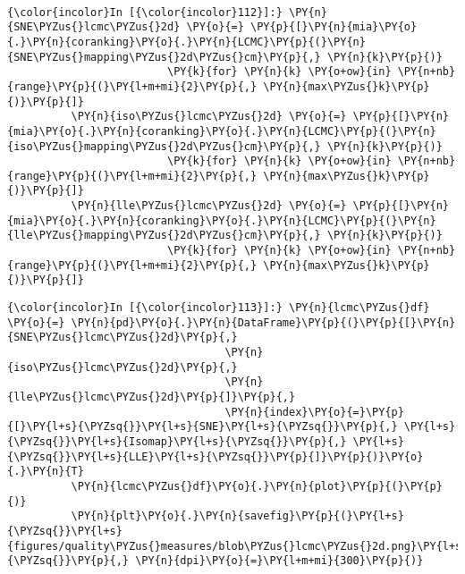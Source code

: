     \begin{center}
    \end{center}
    { \hspace*{\fill} \\}

    \begin{Verbatim}[commandchars=\\\{\}]
{\color{incolor}In [{\color{incolor}112}]:} \PY{n}{SNE\PYZus{}lcmc\PYZus{}2d} \PY{o}{=} \PY{p}{[}\PY{n}{mia}\PY{o}{.}\PY{n}{coranking}\PY{o}{.}\PY{n}{LCMC}\PY{p}{(}\PY{n}{SNE\PYZus{}mapping\PYZus{}2d\PYZus{}cm}\PY{p}{,} \PY{n}{k}\PY{p}{)}
                         \PY{k}{for} \PY{n}{k} \PY{o+ow}{in} \PY{n+nb}{range}\PY{p}{(}\PY{l+m+mi}{2}\PY{p}{,} \PY{n}{max\PYZus{}k}\PY{p}{)}\PY{p}{]}
          \PY{n}{iso\PYZus{}lcmc\PYZus{}2d} \PY{o}{=} \PY{p}{[}\PY{n}{mia}\PY{o}{.}\PY{n}{coranking}\PY{o}{.}\PY{n}{LCMC}\PY{p}{(}\PY{n}{iso\PYZus{}mapping\PYZus{}2d\PYZus{}cm}\PY{p}{,} \PY{n}{k}\PY{p}{)}
                         \PY{k}{for} \PY{n}{k} \PY{o+ow}{in} \PY{n+nb}{range}\PY{p}{(}\PY{l+m+mi}{2}\PY{p}{,} \PY{n}{max\PYZus{}k}\PY{p}{)}\PY{p}{]}
          \PY{n}{lle\PYZus{}lcmc\PYZus{}2d} \PY{o}{=} \PY{p}{[}\PY{n}{mia}\PY{o}{.}\PY{n}{coranking}\PY{o}{.}\PY{n}{LCMC}\PY{p}{(}\PY{n}{lle\PYZus{}mapping\PYZus{}2d\PYZus{}cm}\PY{p}{,} \PY{n}{k}\PY{p}{)}
                         \PY{k}{for} \PY{n}{k} \PY{o+ow}{in} \PY{n+nb}{range}\PY{p}{(}\PY{l+m+mi}{2}\PY{p}{,} \PY{n}{max\PYZus{}k}\PY{p}{)}\PY{p}{]}
\end{Verbatim}

    \begin{Verbatim}[commandchars=\\\{\}]
{\color{incolor}In [{\color{incolor}113}]:} \PY{n}{lcmc\PYZus{}df} \PY{o}{=} \PY{n}{pd}\PY{o}{.}\PY{n}{DataFrame}\PY{p}{(}\PY{p}{[}\PY{n}{SNE\PYZus{}lcmc\PYZus{}2d}\PY{p}{,}
                                  \PY{n}{iso\PYZus{}lcmc\PYZus{}2d}\PY{p}{,}
                                  \PY{n}{lle\PYZus{}lcmc\PYZus{}2d}\PY{p}{]}\PY{p}{,}
                                  \PY{n}{index}\PY{o}{=}\PY{p}{[}\PY{l+s}{\PYZsq{}}\PY{l+s}{SNE}\PY{l+s}{\PYZsq{}}\PY{p}{,} \PY{l+s}{\PYZsq{}}\PY{l+s}{Isomap}\PY{l+s}{\PYZsq{}}\PY{p}{,} \PY{l+s}{\PYZsq{}}\PY{l+s}{LLE}\PY{l+s}{\PYZsq{}}\PY{p}{]}\PY{p}{)}\PY{o}{.}\PY{n}{T}
          \PY{n}{lcmc\PYZus{}df}\PY{o}{.}\PY{n}{plot}\PY{p}{(}\PY{p}{)}
          \PY{n}{plt}\PY{o}{.}\PY{n}{savefig}\PY{p}{(}\PY{l+s}{\PYZsq{}}\PY{l+s}{figures/quality\PYZus{}measures/blob\PYZus{}lcmc\PYZus{}2d.png}\PY{l+s}{\PYZsq{}}\PY{p}{,} \PY{n}{dpi}\PY{o}{=}\PY{l+m+mi}{300}\PY{p}{)}
\end{Verbatim}

